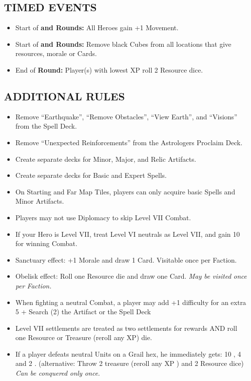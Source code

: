 \begin{multicols*}{2}
\subsection*{\MakeUppercase{Timed Events}}

\begin{itemize}
  \item Start of \textbf{ and  Rounds:} All Heroes gain +1 Movement.
  \item Start of \textbf{ and  Rounds:} Remove black Cubes from all locations that give resources, morale or Cards.
  \item End of \textbf{ Round:} Player(s) with lowest XP roll 2 Resource dice.
\end{itemize}

\subsection*{\MakeUppercase{Additional Rules}}
\begin{itemize}
  \item Remove ``Earthquake'', ``Remove Obstacles'', ``View Earth'', and ``Visions'' from the Spell Deck.
  \item Remove ``Unexpected Reinforcements'' from the Astrologers Proclaim Deck.
  \item Create separate decks for Minor, Major, and Relic Artifacts.
  \item Create separate decks for Basic and Expert Spells.
  \item On Starting and Far Map Tiles, players can only acquire basic Spells and Minor Artifacts.
  \item Players may not use Diplomacy to skip Level VII Combat.
  \item If your Hero is Level VII, treat Level VI neutrals as Level VII, and gain 10  for winning Combat.
  \item Sanctuary effect: +1 Morale and draw 1 Card. Visitable once per Faction.
  \item Obelisk effect: Roll one Resource die and draw one Card. \textit{May be visited once per Faction.}
  \item When fighting a neutral Combat, a player may add +1 difficulty for an extra 5  + Search (2) the Artifact or the Spell Deck
  \item Level VII settlements are treated as two settlements for rewards AND roll one Resource or Treasure (reroll any XP) die.
  \item If a player defeats neutral Units on a Grail hex, he immediately gets: 10 , 4  and 2 . (alternative: Throw 2 treasure (reroll any XP ) and 2 Resource dice)  \textit{Can be conquered only once.}

\end{itemize}
\end{multicols*}
